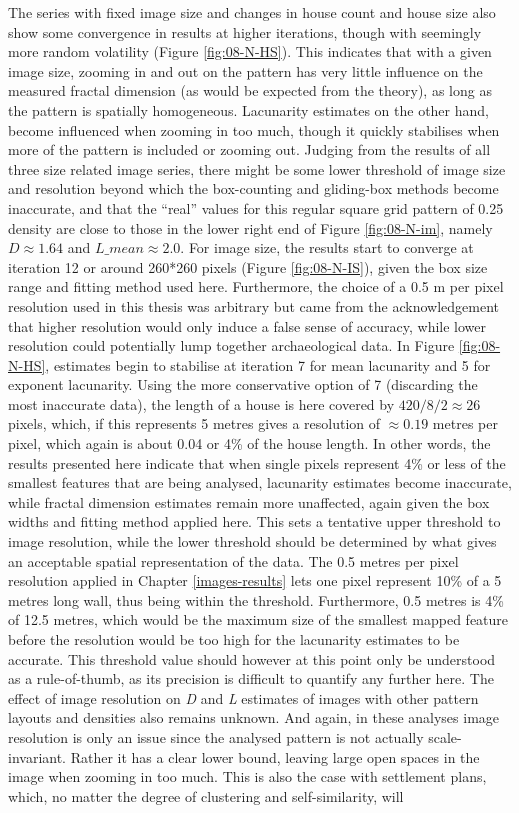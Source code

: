 \documentclass[
  12pt,
]{book}
\begin{document}
The series with fixed image size and changes in house count and house size also show some convergence in results at higher iterations, though with seemingly more random volatility (Figure \ref{fig:08-N-HS}). This indicates that with a given image size, zooming in and out on the pattern has very little influence on the measured fractal dimension (as would be expected from the theory), as long as the pattern is spatially homogeneous. Lacunarity estimates on the other hand, become influenced when zooming in too much, though it quickly stabilises when more of the pattern is included or zooming out. Judging from the results of all three size related image series, there might be some lower threshold of image size and resolution beyond which the box-counting and gliding-box methods become inaccurate, and that the ``real'' values for this regular square grid pattern of 0.25 density are close to those in the lower right end of Figure \ref{fig:08-N-im}, namely \(D \approx 1.64\) and \(L\_mean\approx 2.0\). For image size, the results start to converge at iteration 12 or around 260*260 pixels (Figure \ref{fig:08-N-IS}), given the box size range and fitting method used here. Furthermore, the choice of a 0.5 m per pixel resolution used in this thesis was arbitrary but came from the acknowledgement that higher resolution would only induce a false sense of accuracy, while lower resolution could potentially lump together archaeological data. In Figure \ref{fig:08-N-HS}, estimates begin to stabilise at iteration 7 for mean lacunarity and 5 for exponent lacunarity. Using the more conservative option of 7 (discarding the most inaccurate data), the length of a house is here covered by \(420/8/2 \approx 26\) pixels, which, if this represents 5 metres gives a resolution of \(\approx 0.19\) metres per pixel, which again is about 0.04 or 4\% of the house length. In other words, the results presented here indicate that when single pixels represent 4\% or less of the smallest features that are being analysed, lacunarity estimates become inaccurate, while fractal dimension estimates remain more unaffected, again given the box widths and fitting method applied here. This sets a tentative upper threshold to image resolution, while the lower threshold should be determined by what gives an acceptable spatial representation of the data. The 0.5 metres per pixel resolution applied in Chapter \ref{images-results} lets one pixel represent 10\% of a 5 metres long wall, thus being within the threshold. Furthermore, 0.5 metres is 4\% of 12.5 metres, which would be the maximum size of the smallest mapped feature before the resolution would be too high for the lacunarity estimates to be accurate. This threshold value should however at this point only be understood as a rule-of-thumb, as its precision is difficult to quantify any further here. The effect of image resolution on \emph{D} and \emph{L} estimates of images with other pattern layouts and densities also remains unknown. And again, in these analyses image resolution is only an issue since the analysed pattern is not actually scale-invariant. Rather it has a clear lower bound, leaving large open spaces in the image when zooming in too much. This is also the case with settlement plans, which, no matter the degree of clustering and self-similarity, will 
\end{document}
